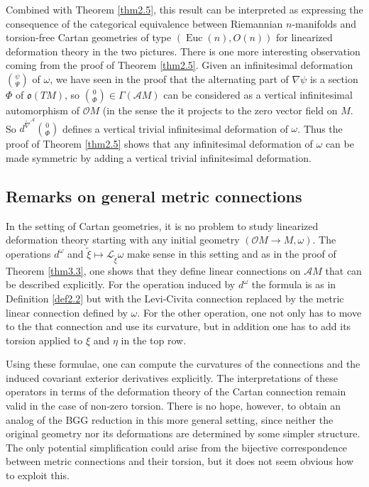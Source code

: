 \documentclass[12pt,a4paper]{amsart}
\def\frak{\mathfrak}
\def\Cal{\mathcal}
\newcommand{\om}{\omega}
\newcommand{\ps}{\psi}
\newcommand{\Ga}{\Gamma}
\newcommand{\Ph}{\Phi}
\newcommand{\Euc}{\operatorname{Euc}}
\newcommand{\tn}{\widetilde{\nabla}}
\numberwithin{theorem}{section}
\numberwithin{equation}{section}
\theoremstyle{definition}
\theoremstyle{remark}
\begin{document}
Combined with Theorem \ref{thm2.5}, this result can be interpreted as expressing the
consequence of the categorical equivalence between Riemannian $n$-manifolds and
torsion-free Cartan geometries of type $(\Euc(n),O(n))$ for linearized deformation
theory in the two pictures. There is one more interesting observation coming from the
proof of Theorem \ref{thm2.5}. Given an infinitesimal deformation $\binom{\ps}{\Psi}$
of $\om$, we have seen in the proof that the alternating part of $\nabla\ps$ is a
section $\Ph$ of $\frak o(TM)$, so $\binom{0}{\Ph}\in\Ga(\Cal AM)$ can be considered
as a vertical infinitesimal automorphism of $\Cal OM$ (in the sense the it projects
to the zero vector field on $M$. So $d^{\tn^{\Cal A}}\binom{0}{\Ph}$ defines a vertical
trivial infinitesimal deformation of $\om$. Thus the proof of Theorem \ref{thm2.5}
shows that any infinitesimal deformation of $\om$ can be made symmetric by adding a
vertical trivial infinitesimal deformation. 

\subsection{Remarks on general metric connections}\label{3.8}
In the setting of Cartan geometries, it is no problem to study linearized deformation
theory starting with any initial geometry $(\Cal OM\to M,\om)$. The operations
$d^\om$ and $\tilde\xi\mapsto\Cal L_{\tilde\xi}\om$ make sense in this setting and as
in the proof of Theorem \ref{thm3.3}, one shows that they define linear connections
on $\Cal AM$ that can be described explicitly. For the operation induced by $d^\om$
the formula is as in Definition \ref{def2.2} but with the Levi-Civita connection
replaced by the metric linear connection defined by $\om$. For the other operation,
one not only has to move to the that connection and use its curvature, but in addition
one has to add its torsion applied to $\xi$ and $\eta$ in the top row.

Using these formulae, one can compute the curvatures of the connections and the
induced covariant exterior derivatives explicitly. The interpretations of these
operators in terms of the deformation theory of the Cartan connection remain valid in
the case of non-zero torsion. There is no hope, however, to obtain an analog of the
BGG reduction in this more general setting, since neither the original geometry nor
its deformations are determined by some simpler structure. The only potential
simplification could arise from the bijective correspondence between metric
connections and their torsion, but it does not seem obvious how to exploit this.
\end{document}
